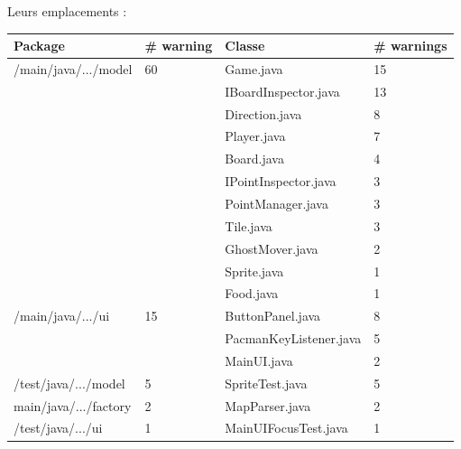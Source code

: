 \documentclass[12pt,a4paper,final]{article}
\begin{document}
Leurs emplacements : \\
\begin{tabular}{|l|l|l|l|}
\hline
Package & \# warning & Classe & \# warnings \\
\hline
/main/java/.../model & 60 & Game.java & 15 \\
&& IBoardInspector.java & 13 \\
&& Direction.java & 8 \\
&& Player.java & 7 \\
&& Board.java & 4 \\
&& IPointInspector.java & 3 \\
&& PointManager.java & 3 \\
&& Tile.java & 3 \\
&& GhostMover.java & 2 \\
&& Sprite.java & 1 \\
&& Food.java & 1 \\
\hline
/main/java/.../ui & 15 & ButtonPanel.java & 8 \\
&& PacmanKeyListener.java & 5 \\
&& MainUI.java & 2 \\
\hline
/test/java/.../model & 5 & SpriteTest.java & 5 \\
\hline
main/java/.../factory & 2 & MapParser.java & 2 \\
\hline
/test/java/.../ui & 1 & MainUIFocusTest.java & 1 \\
\hline
\end{tabular}
\end{document}
